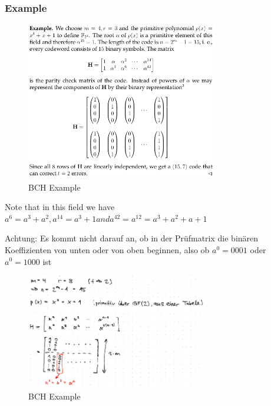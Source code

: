 \hypertarget{example}{%
\subsubsection{Example}\label{example}}

\begin{figure}[H]
\centering
\includegraphics[width=0.75\textwidth]{figures/bchExample.png}
\caption{BCH Example}
\end{figure}

Note that in this field we have $a^6 = a^3 + a^2 , a^{14} = a^3 + 1 and a^{42} =
a^{12} = a^3 + a^2 + a + 1$

\begin{tcolorbox}[colback=red!5!white,colframe=red!75!black]
Achtung: Es kommt nicht darauf an, ob in der Prüfmatrix die binären Koeffizienten von unten oder von oben beginnen, also ob $a^0 = 0001$ oder $a^0 = 1000$ ist
\end{tcolorbox}

\begin{figure}[H]
\centering
\includegraphics[width=0.7\textwidth]{figures/bch-Example.png}
\caption{BCH Example}
\end{figure}

